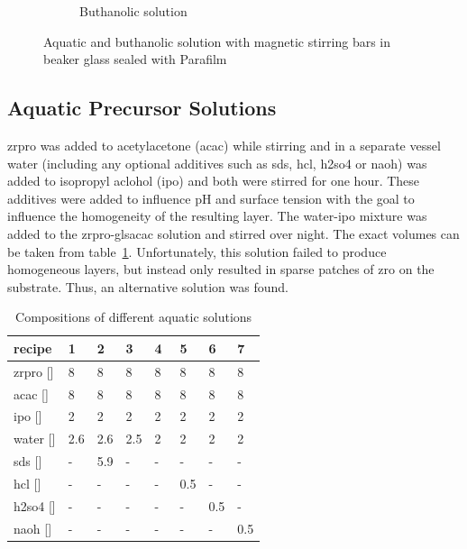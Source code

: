 \begin{figure}[htb]
\begin{subfigure}{0.49\textwidth}
		\label{fig:sol-bu}
		\caption{Buthanolic solution}
	\end{subfigure}
	\label{fig:sol}
	\caption{Aquatic and buthanolic solution with magnetic stirring bars in beaker glass sealed with Parafilm} 
\end{figure}
\fi

\subsection{Aquatic Precursor Solutions}
\label{sec:exp-sol-aq}
\gls{zrpro} was added to acetylacetone (\gls{acac}) while stirring and in a separate vessel \gls{water} 
(including any optional additives such as \gls{sds}, \gls{hcl}, \gls{h2so4} or \gls{naoh}) 
was added to isopropyl aclohol (\gls{ipo}) and both were stirred for one hour. 
These additives were added to influence pH and surface tension with the goal to influence the homogeneity of the resulting layer. %
The \gls{water}-\gls{ipo} mixture was added to the \gls{zrpro}-gls{acac} solution and stirred over night. 
The exact volumes can be taken from table~\ref{tab:rec1}.
Unfortunately, this solution failed to produce homogeneous layers, but instead only resulted in sparse patches of \gls{zro} on the substrate.
Thus, an alternative solution was found.
\begin{table}[h]
	\centering
	\caption{Compositions of different aquatic solutions}
	\label{tab:rec1}
	\begin{tabular}{llllllll}
		\hline
		recipe				&1		&2		&3		&4		&5		&6		&7\\
		\hline
		\gls{zrpro} [\ml{}]	&8		&8		&8		&8		&8		&8		&8\\
		\gls{acac}  [\ml{}]	&8		&8		&8		&8		&8		&8		&8\\
		\gls{ipo}   [\ml{}]	&2		&2		&2		&2		&2		&2		&2\\
		\gls{water} [\ml{}]	&2.6	&2.6	&2.5	&2~		&2		&2		&2\\
		\gls{sds}   [\mg{}]	&-		&5.9	&-		&-		&-		&-		&-\\
		\gls{hcl}   [\ml{}]	&-		&-		&-		&-		&0.5	&-		&-\\
		\gls{h2so4} [\ml{}]	&-		&-		&-		&-		&-		&0.5	&-\\
		\gls{naoh}  [\ml{}] &-		&-		&-		&-		&-		&-		&0.5\\
		\hline
	\end{tabular}
\end{table}
%

